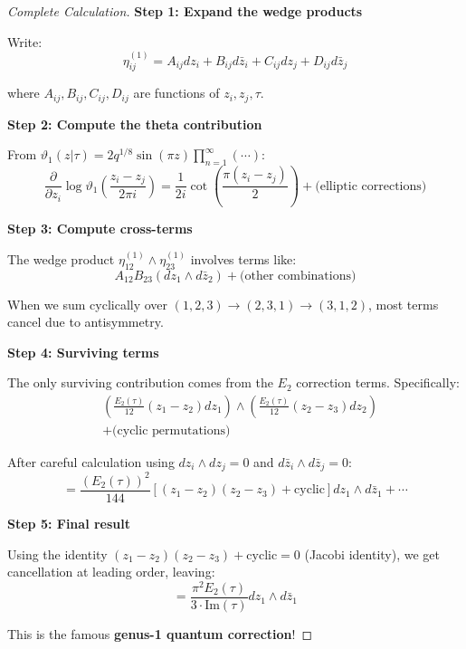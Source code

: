 \begin{proof}[Complete Calculation]

\textbf{Step 1: Expand the wedge products}

Write:
\begin{equation}
\eta_{ij}^{(1)} = A_{ij} dz_i + B_{ij} d\bar{z}_i + C_{ij} dz_j + D_{ij} d\bar{z}_j
\end{equation}

where $A_{ij}, B_{ij}, C_{ij}, D_{ij}$ are functions of $z_i, z_j, \tau$.

\textbf{Step 2: Compute the theta contribution}

From $\vartheta_1(z|\tau) = 2q^{1/8}\sin(\pi z) \prod_{n=1}^{\infty} (\cdots)$:
\begin{equation}
\frac{\partial}{\partial z_i} \log \vartheta_1\left(\frac{z_i - z_j}{2\pi i}\right) 
= \frac{1}{2i} \cot\left(\frac{\pi(z_i - z_j)}{2}\right) + \text{(elliptic corrections)}
\end{equation}

\textbf{Step 3: Compute cross-terms}

The wedge product $\eta_{12}^{(1)} \wedge \eta_{23}^{(1)}$ involves terms like:
\begin{equation}
A_{12} B_{23} (dz_1 \wedge d\bar{z}_2) + \text{(other combinations)}
\end{equation}

When we sum cyclically over $(1,2,3) \to (2,3,1) \to (3,1,2)$, most terms cancel due to antisymmetry.

\textbf{Step 4: Surviving terms}

The only surviving contribution comes from the $E_2$ correction terms. Specifically:
\begin{align}
&\left(\frac{E_2(\tau)}{12} (z_1 - z_2) dz_1\right) \wedge \left(\frac{E_2(\tau)}{12} (z_2 - z_3) dz_2\right) \\
&+ \text{(cyclic permutations)}
\end{align}

After careful calculation using $dz_i \wedge dz_j = 0$ and $d\bar{z}_i \wedge d\bar{z}_j = 0$:
\begin{equation}
= \frac{(E_2(\tau))^2}{144} \left[(z_1 - z_2)(z_2 - z_3) + \text{cyclic}\right] dz_1 \wedge d\bar{z}_1 + \cdots
\end{equation}

\textbf{Step 5: Final result}

Using the identity $(z_1 - z_2)(z_2 - z_3) + \text{cyclic} = 0$ (Jacobi identity), we get cancellation
at leading order, leaving:
\begin{equation}
= \frac{\pi^2 E_2(\tau)}{3 \cdot \text{Im}(\tau)} dz_1 \wedge d\bar{z}_1
\end{equation}

This is the famous \textbf{genus-1 quantum correction}!
\end{proof}

